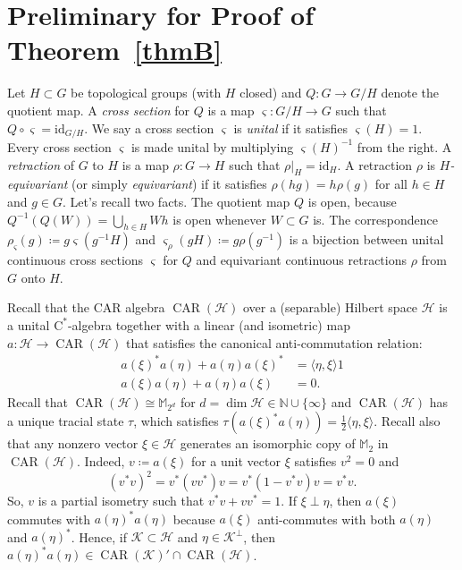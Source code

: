 \documentclass[12pt,nosumlimits,nonamelimits]{amsart}
\theoremstyle{remark}
\newcommand{\IM}{\mathbb{M}}
\newcommand{\IN}{\mathbb{N}}
\newcommand{\cH}{\mathcal{H}}
\newcommand{\cK}{\mathcal{K}}
\newcommand{\vs}{\varsigma}
\newcommand{\id}{\mathrm{id}}
\DeclareMathOperator{\Aut}{Aut}
\DeclareMathOperator{\CAR}{CAR}
\newcommand{\ip}[1]{\mathopen{\langle}#1\mathclose{\rangle}}
\begin{document}
%
% 
%
\section{Preliminary for Proof of Theorem~\ref{thmB}}\label{sec:prelim2}
%
Let $H\subset G$ be topological groups (with $H$ closed) 
and $Q\colon G\to G/H$ denote the quotient map. 
A \emph{cross section} for $Q$ 
is a map $\vs\colon G/H\to G$ 
such that $Q\circ\vs=\id_{G/H}$. 
We say a cross section $\vs$ is \emph{unital} if 
it satisfies $\vs(H)=1$. 
Every cross section $\vs$ is made unital 
by multiplying $\vs(H)^{-1}$ from the right. 
A \emph{retraction} of $G$ to $H$ is a map 
$\rho\colon G\to H$ such that $\rho|_H=\id_H$. 
A retraction $\rho$ is \emph{$H$-equivariant} 
(or simply \emph{equivariant}) if 
it satisfies 
$\rho(hg)=h\rho(g)$ for all $h\in H$ and $g\in G$. 
Let's recall two facts. 
The quotient map $Q$ is open, 
because $Q^{-1}(Q(W))=\bigcup_{h\in H}Wh$ 
is open whenever $W\subset G$ is. 
The correspondence $\rho_\vs(g)\coloneqq g\vs(g^{-1}H)$ 
and $\vs_\rho(gH)\coloneqq g\rho(g^{-1})$ is a bijection 
between unital continuous cross sections $\vs$ for $Q$ and 
equivariant continuous retractions $\rho$ from $G$ onto $H$.

Recall that the CAR algebra $\CAR(\cH)$ over 
a (separable) Hilbert space $\cH$ 
is a unital $\mathrm{C}^*$-algebra together with 
a linear (and isometric) map 
$a\colon\cH\to\CAR(\cH)$ that satisfies 
the canonical anti-commutation relation: 
\begin{align*}
a(\xi)^*a(\eta)+a(\eta)a(\xi)^* &= \ip{\eta,\xi}1 \\
a(\xi)a(\eta)+a(\eta)a(\xi) &= 0.
\end{align*}
Recall that $\CAR(\cH)\cong\IM_{2^d}$ 
for $d=\dim\cH \in\IN\cup\{\infty\}$ and 
$\CAR(\cH)$ has a unique tracial state $\tau$, 
which satisfies $\tau(a(\xi)^*a(\eta))=\frac{1}{2}\ip{\eta,\xi}$. 
Recall also that any nonzero vector $\xi\in\cH$ generates 
an isomorphic copy of $\IM_2$ in $\CAR(\cH)$. 
Indeed, $v\coloneqq a(\xi)$ for a unit vector $\xi$ satisfies $v^2=0$ and 
\[
(v^*v)^2=v^*(vv^*)v=v^*(1-v^*v)v=v^*v.
\]
So, $v$ is a partial isometry such that $v^*v+vv^*=1$.
If $\xi\perp\eta$, then 
$a(\xi)$ commutes with $a(\eta)^*a(\eta)$ because 
$a(\xi)$ anti-commutes with both $a(\eta)$ and $a(\eta)^*$. 
Hence, if $\cK\subset\cH$ and $\eta\in\cK^\perp$, then 
$a(\eta)^*a(\eta)\in \CAR(\cK)'\cap\CAR(\cH)$. 
\end{document}
